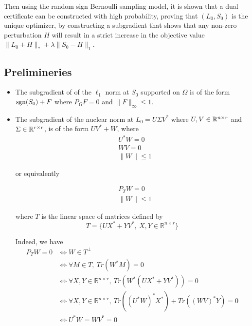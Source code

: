 Then using the random sign Bernoulli sampling model, it is shown that a dual certificate can be constructed with high probability, proving that $(L_0, S_0)$ is the unique optimizer, by constructing a subgradient that shows that any non-zero perturbation $H$ will result in a strict increase in the objective value $\|L_0 + H\|_* + \lambda \|S_0 - H\|_1$.

\subsection{Prelimineries}
\begin{itemize}
\item The subgradient of of the $\ell_1$ norm at $S_0$ supported on $\Omega$ is of the form $\text{sgn}(S_0)+F$ where $P_\Omega F = 0$ and $\|F\|_\infty \leq 1$.
\item The subgradient of the nuclear norm at $L_0 = U\Sigma V^*$ where $U, V \in {\mathbb R}^{n \times r}$ and $\Sigma \in {\mathbb R}^{r \times r}$, is of the form $U V^* + W$, where 
\begin{equation}
\begin{aligned}
&U^*W = 0 \\
& WV = 0\\
& \|W\| \leq 1
\end{aligned}
\end{equation}

or equivalently

\begin{equation}
\begin{aligned}
& P_T W = 0 \\
& \|W\| \leq 1
\end{aligned}
\end{equation}

where $T$ is the linear space of matrices defined by
\[
T = \{UX^* + YV^*, \  X, Y \in \mathbb{R}^{n \times r}\}
\]

Indeed, we have
\begin{align*}
P_TW = 0
&\Leftrightarrow W \in T^\perp  \\
&\Leftrightarrow \forall M \in T, \ Tr(W^*M) = 0\\
&\Leftrightarrow \forall X, Y \in \mathbb{R}^{n \times r}, \ Tr(W^*(UX^* + YV^*)) = 0\\
&\Leftrightarrow \forall X, Y \in \mathbb{R}^{n \times r}, \ Tr((U^*W)^*X^*) + Tr((WV)^*Y) = 0\\
&\Leftrightarrow U^*W = WV^* = 0
\end{align*}


\end{itemize}

